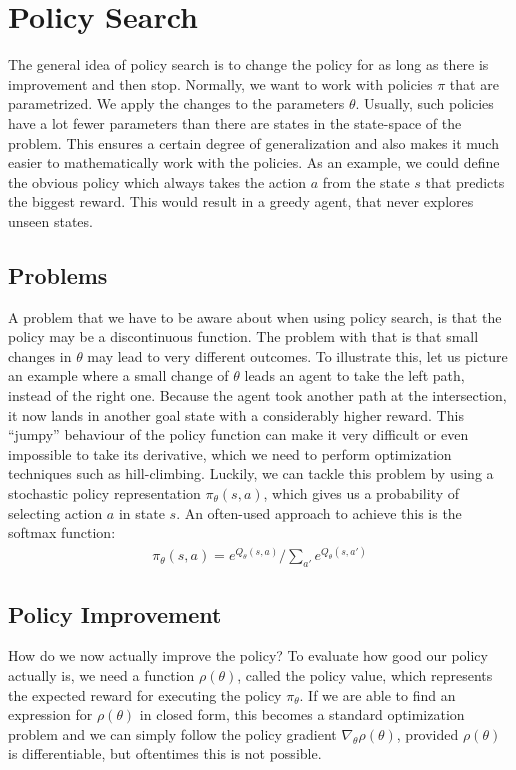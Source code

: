 \documentclass{llncs}
\begin{document}
\section{Policy Search}
The general idea of policy search is to change the policy for as long as there is improvement and then stop. Normally, we want to work with policies $\pi$ that are parametrized. We apply the changes to the parameters $\theta$. Usually, such policies have a lot fewer parameters than there are states in the state-space of the problem. This ensures a certain degree of generalization and also makes it much easier to mathematically work with the policies. As an example, we could define the obvious policy which always takes the action $a$ from the state $s$ that predicts the biggest reward. This would result in a greedy agent, that never explores unseen states.

\subsection{Problems}
A problem that we have to be aware about when using policy search, is that the policy may be a discontinuous function. The problem with that is that small changes in $\theta$ may lead to very different outcomes. To illustrate this, let us picture an example where a small change of $\theta$ leads an agent to take the left path, instead of the right one. Because the agent took another path at the intersection, it now lands in another goal state with a considerably higher reward. This “jumpy” behaviour of the policy function can make it very difficult or even impossible to take its derivative, which we need to perform optimization techniques such as hill-climbing. Luckily, we can tackle this problem by using a stochastic policy representation $\pi_{\theta}(s,a)$, which gives us a probability of selecting action $a$ in state $s$. An often-used approach to achieve this is the softmax function:
\begin{align*}
	\pi_{\theta}(s,a)=e^{Q_{\theta}(s,a)}/\sum_{a'}e^{Q_{\theta}(s,a')}
\end{align*}

\subsection{Policy Improvement}
How do we now actually improve the policy? To evaluate how good our policy actually is, we need a function $\rho(\theta)$, called the policy value, which represents the expected reward for executing the policy $\pi_{\theta}$. If we are able to find an expression for $\rho(\theta)$ in closed form, this becomes a standard optimization problem and we can simply follow the policy gradient $\nabla_{\theta}\rho(\theta)$, provided $\rho(\theta)$ is differentiable, but oftentimes this is not possible.\par
\end{document}
